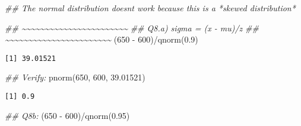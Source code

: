 \documentclass[
  letterpaper,
  DIV=11,
  numbers=noendperiod]{scrreprt}
\newenvironment{Shaded}{\begin{snugshade}}{\end{snugshade}}
\newcommand{\DecValTok}[1]{\textcolor[rgb]{0.68,0.00,0.00}{#1}}
\newcommand{\DocumentationTok}[1]{\textcolor[rgb]{0.37,0.37,0.37}{\textit{#1}}}
\newcommand{\FloatTok}[1]{\textcolor[rgb]{0.68,0.00,0.00}{#1}}
\newcommand{\FunctionTok}[1]{\textcolor[rgb]{0.28,0.35,0.67}{#1}}
\newcommand{\NormalTok}[1]{\textcolor[rgb]{0.00,0.23,0.31}{#1}}
\newcommand{\SpecialCharTok}[1]{\textcolor[rgb]{0.37,0.37,0.37}{#1}}
\begin{document}
\begin{Shaded}
\begin{Highlighting}[]
\DocumentationTok{\#\# The normal distribution doesn\textquotesingle{}t work because this is a *skewed distribution*}

\DocumentationTok{\#\# \textasciitilde{}\textasciitilde{}\textasciitilde{}\textasciitilde{}\textasciitilde{}\textasciitilde{}\textasciitilde{}\textasciitilde{}\textasciitilde{}\textasciitilde{}\textasciitilde{}\textasciitilde{}\textasciitilde{}\textasciitilde{}\textasciitilde{}\textasciitilde{}\textasciitilde{}\textasciitilde{}\textasciitilde{}\textasciitilde{}\textasciitilde{}\textasciitilde{}\textasciitilde{}}
\DocumentationTok{\#\# Q8.a) sigma = (x {-} mu)/z}
\DocumentationTok{\#\# \textasciitilde{}\textasciitilde{}\textasciitilde{}\textasciitilde{}\textasciitilde{}\textasciitilde{}\textasciitilde{}\textasciitilde{}\textasciitilde{}\textasciitilde{}\textasciitilde{}\textasciitilde{}\textasciitilde{}\textasciitilde{}\textasciitilde{}\textasciitilde{}\textasciitilde{}\textasciitilde{}\textasciitilde{}\textasciitilde{}\textasciitilde{}\textasciitilde{}\textasciitilde{}}
\NormalTok{(}\DecValTok{650} \SpecialCharTok{{-}} \DecValTok{600}\NormalTok{)}\SpecialCharTok{/}\FunctionTok{qnorm}\NormalTok{(}\FloatTok{0.9}\NormalTok{)}
\end{Highlighting}
\end{Shaded}

\begin{verbatim}
[1] 39.01521
\end{verbatim}

\begin{Shaded}
\begin{Highlighting}[]
\DocumentationTok{\#\# Verify:}
\FunctionTok{pnorm}\NormalTok{(}\DecValTok{650}\NormalTok{, }\DecValTok{600}\NormalTok{, }\FloatTok{39.01521}\NormalTok{)}
\end{Highlighting}
\end{Shaded}

\begin{verbatim}
[1] 0.9
\end{verbatim}

\begin{Shaded}
\begin{Highlighting}[]
\DocumentationTok{\#\# Q8b:}
\NormalTok{(}\DecValTok{650} \SpecialCharTok{{-}} \DecValTok{600}\NormalTok{)}\SpecialCharTok{/}\FunctionTok{qnorm}\NormalTok{(}\FloatTok{0.95}\NormalTok{)}
\end{Highlighting}
\end{Shaded}
\end{document}
